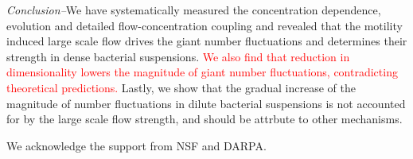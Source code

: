 \documentclass[twocolumn,aps,prl,amsmath,amssymb,longbibliography]{revtex4-1}
\begin{document}
\textit{Conclusion--}We have systematically measured the concentration dependence, evolution and detailed flow-concentration coupling and revealed that the motility induced large scale flow drives the giant number fluctuations and determines their strength in dense bacterial suspensions. \textcolor{red}{We also find that reduction in dimensionality lowers the magnitude of giant number fluctuations, contradicting theoretical predictions.} Lastly, we show that the gradual increase of the magnitude of number fluctuations in dilute bacterial suspensions is not accounted for by the large scale flow strength, and should be attrbute to other mechanisms.

We acknowledge the support from NSF and DARPA.


%

\end{document}
